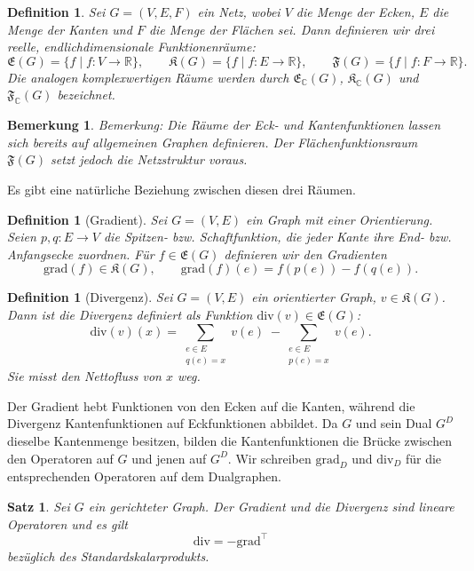 \documentclass[11pt,a4paper,leqno]{report}
\newtheorem{proposition}{Satz}[chapter]
\newtheorem{definition}[theorem]{Definition}
\newtheorem{remark}[theorem]{Bemerkung}
\numberwithin{equation}{chapter}
\begin{document}
\begin{definition}
	Sei $G=(V,E,F)$ ein Netz, wobei $V$ die Menge der Ecken, $E$ die Menge der Kanten und $F$ die Menge der Flächen sei. 
	Dann definieren wir drei reelle, endlichdimensionale Funktionenräume:
	\[
	\mathfrak{E}(G) = \{f \mid f: V \to \mathbb{R}\}, \qquad
	\mathfrak{K}(G) = \{f \mid f: E \to \mathbb{R}\}, \qquad
	\mathfrak{F}(G) = \{f \mid f: F \to \mathbb{R}\}.
	\]
	Die analogen komplexwertigen Räume werden durch $\mathfrak{E}_\mathbb{C}(G)$, 
	$\mathfrak{K}_\mathbb{C}(G)$ und $\mathfrak{F}_\mathbb{C}(G)$ bezeichnet.
\end{definition}
\begin{remark}
	\emph{Bemerkung:} Die Räume der Eck- und Kantenfunktionen lassen sich bereits auf allgemeinen Graphen definieren. 
	Der Flächenfunktionsraum $\mathfrak{F}(G)$ setzt jedoch die Netzstruktur voraus.
\end{remark}
\noindent
Es gibt eine nat\"urliche Beziehung zwischen diesen drei R\"aumen. 
\begin{definition}[Gradient]
	Sei $G=(V,E)$ ein Graph mit einer Orientierung. 
	Seien $p,q:E\to V$ die \emph{Spitzen-} bzw. \emph{Schaftfunktion}, die jeder Kante ihre End- bzw. Anfangsecke zuordnen. 
	Für $f \in \mathfrak{E}(G)$ definieren wir den \emph{Gradienten}
	\[
	\mathrm{grad}(f)\in \mathfrak{K}(G), \qquad 
	\mathrm{grad}(f)(e) = f(p(e)) - f(q(e)).
	\]
\end{definition}
\begin{definition}[Divergenz]
	Sei $G=(V,E)$ ein orientierter Graph, $v\in \mathfrak{K}(G)$. 
	Dann ist die \emph{Divergenz} definiert als Funktion $\mathrm{div}(v)\in \mathfrak{E}(G)$:
	\[
	\mathrm{div}(v)(x) = 
	\sum_{\substack{e\in E \\ q(e)=x}}v(e) \;-\!
	\sum_{\substack{e\in E \\ p(e)=x}}v(e).
	\]
	Sie misst den Nettofluss von $x$ weg.
\end{definition}
\noindent
Der Gradient hebt Funktionen von den Ecken auf die Kanten, während die Divergenz Kantenfunktionen auf Eckfunktionen abbildet.  
Da $G$ und sein Dual $G^D$ dieselbe Kantenmenge besitzen, bilden die Kantenfunktionen die Brücke zwischen den Operatoren auf $G$ und jenen auf $G^D$.  
Wir schreiben $\mathrm{grad}_D$ und $\mathrm{div}_D$ für die entsprechenden Operatoren auf dem Dualgraphen. 
\begin{proposition}
	Sei $G$ ein gerichteter Graph. Der Gradient und die Divergenz sind lineare Operatoren und es gilt
	\[
	\mathrm{div} = - \mathrm{grad}^\top
	\]
	bezüglich des Standardskalarprodukts.
\end{proposition}
\end{document}

